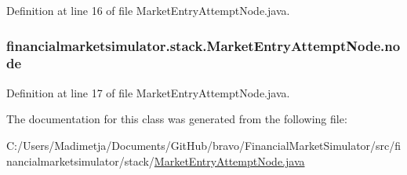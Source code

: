 Definition at line 16 of file Market\+Entry\+Attempt\+Node.\+java.

\hypertarget{classfinancialmarketsimulator_1_1stack_1_1_market_entry_attempt_node_a9a2784e51cab776b17f9957dbb2feb04}{
\subsubsection[{node}]{ financialmarketsimulator.\+stack.\+Market\+Entry\+Attempt\+Node.\+node}}\label{classfinancialmarketsimulator_1_1stack_1_1_market_entry_attempt_node_a9a2784e51cab776b17f9957dbb2feb04}


Definition at line 17 of file Market\+Entry\+Attempt\+Node.\+java.



The documentation for this class was generated from the following file\+:\begin{DoxyCompactItemize}
\item 
C\+:/\+Users/\+Madimetja/\+Documents/\+Git\+Hub/bravo/\+Financial\+Market\+Simulator/src/financialmarketsimulator/stack/\hyperlink{_market_entry_attempt_node_8java}{Market\+Entry\+Attempt\+Node.\+java}\end{DoxyCompactItemize}
